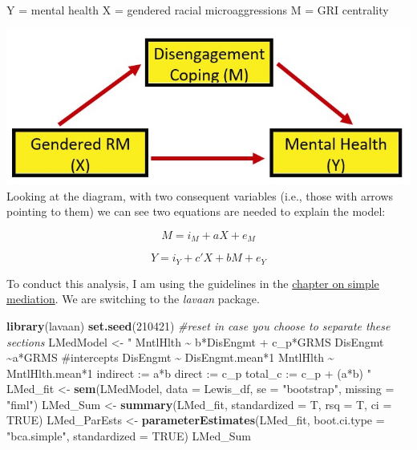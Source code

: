 \documentclass[
  11pt,
]{book}
\newenvironment{Shaded}{\begin{snugshade}}{\end{snugshade}}
\newcommand{\AttributeTok}[1]{\textcolor[rgb]{0.27,0.27,0.27}{#1}}
\newcommand{\CommentTok}[1]{\textcolor[rgb]{0.37,0.37,0.37}{\textit{#1}}}
\newcommand{\ConstantTok}[1]{\textcolor[rgb]{0.37,0.37,0.37}{#1}}
\newcommand{\DecValTok}[1]{\textcolor[rgb]{0.06,0.06,0.06}{#1}}
\newcommand{\FunctionTok}[1]{\textcolor[rgb]{0.27,0.27,0.27}{\textbf{#1}}}
\newcommand{\NormalTok}[1]{#1}
\newcommand{\OtherTok}[1]{\textcolor[rgb]{0.37,0.37,0.37}{#1}}
\newcommand{\StringTok}[1]{\textcolor[rgb]{0.5,0.5,0.5}{#1}}
\begin{document}
Y = mental health X = gendered racial microaggressions M = GRI centrality

\includegraphics{images/ModMed/LewisMed.jpg} Looking at the diagram, with two consequent variables (i.e., those with arrows pointing to them) we can see two equations are needed to explain the model:

\[M = i_{M}+aX + e_{M}\]

\[Y = i_{Y}+c'X+ bM+e_{Y}\]

To conduct this analysis, I am using the guidelines in the \protect\hyperlink{SimpleMed}{chapter on simple mediation}. We are switching to the \emph{lavaan} package.

\begin{Shaded}
\begin{Highlighting}[]
\FunctionTok{library}\NormalTok{(lavaan)}
\FunctionTok{set.seed}\NormalTok{(}\DecValTok{210421}\NormalTok{)  }\CommentTok{\#reset in case you choose to separate these sections}
\NormalTok{LMedModel }\OtherTok{\textless{}{-}} \StringTok{"}
\StringTok{          MntlHlth \textasciitilde{} b*DisEngmt + c\_p*GRMS }
\StringTok{          DisEngmt \textasciitilde{}a*GRMS}
\StringTok{          }
\StringTok{          \#intercepts}
\StringTok{          DisEngmt \textasciitilde{} DisEngmt.mean*1}
\StringTok{          MntlHlth \textasciitilde{} MntlHlth.mean*1}
\StringTok{          }
\StringTok{          indirect :=  a*b}
\StringTok{          direct  := c\_p}
\StringTok{          total\_c  := c\_p + (a*b)}
\StringTok{          "}
\NormalTok{LMed\_fit }\OtherTok{\textless{}{-}} \FunctionTok{sem}\NormalTok{(LMedModel, }\AttributeTok{data =}\NormalTok{ Lewis\_df, }\AttributeTok{se =} \StringTok{"bootstrap"}\NormalTok{, }\AttributeTok{missing =} \StringTok{"fiml"}\NormalTok{)}
\NormalTok{LMed\_Sum }\OtherTok{\textless{}{-}} \FunctionTok{summary}\NormalTok{(LMed\_fit, }\AttributeTok{standardized =}\NormalTok{ T, }\AttributeTok{rsq =}\NormalTok{ T, }\AttributeTok{ci =} \ConstantTok{TRUE}\NormalTok{)}
\NormalTok{LMed\_ParEsts }\OtherTok{\textless{}{-}} \FunctionTok{parameterEstimates}\NormalTok{(LMed\_fit, }\AttributeTok{boot.ci.type =} \StringTok{"bca.simple"}\NormalTok{,}
    \AttributeTok{standardized =} \ConstantTok{TRUE}\NormalTok{)}
\NormalTok{LMed\_Sum}
\end{Highlighting}
\end{Shaded}
\end{document}
